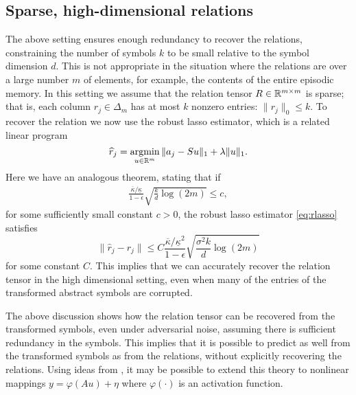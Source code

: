   \subsection{Sparse, high-dimensional relations}

 The above setting ensures enough redundancy to recover the relations, constraining the number of symbols $k$ to be small relative to the symbol dimension $d$. This is not appropriate in the situation where the relations are over a large number $m$ of elements, for example, the contents of the entire episodic memory.
 In this setting we assume that the relation tensor $R \in \mathbb{R}^{m\times m}$ is sparse; that is,
 each column $r_j \in \Delta_m$ has at most $k$ nonzero entries: $\|r_j\|_0 \leq k$. To recover the relation
 we now use the robust lasso estimator, which is a related linear program
\begin{equation}
  \hat r_j = \argmin_{u \in\reals^m} \| a_j - S u\|_1 + \lambda\|u\|_1. \label{eq:rlasso}
\end{equation}
Here we have an analogous theorem, stating that if
\begin{eqnarray}
  \frac{\overline{\kappa}/\underline{\kappa}}{1-\epsilon}\sqrt{\frac{k}{d}\log(2m)}\leq c,
\end{eqnarray}
for some sufficiently small constant $c>0$, the robust lasso estimator \eqref{eq:rlasso} satisfies
\begin{equation}
  \|\hat r_j - r_j\| \leq C \frac{\overline{\kappa}/\underline{\kappa}^2}{1-\epsilon} \sqrt{\frac{\sigma^2 k}{d} \log(2m)}
\end{equation}
for some constant $C$.
This implies that we can accurately recover the relation tensor in the high dimensional setting, even when many of the entries of the transformed abstract symbols are corrupted.


The above discussion shows how the relation tensor can be recovered from the transformed symbols, even under adversarial noise, assuming there is sufficient redundancy in the symbols. This implies that it is possible to predict as well from the transformed symbols as from the relations, without explicitly recovering the relations. 
Using ideas from \citep{surfing,HandV17}, it may be possible to extend this theory to nonlinear mappings 
$y = \varphi(Au) + \eta$ where $\varphi(\cdot)$ is an activation function.

